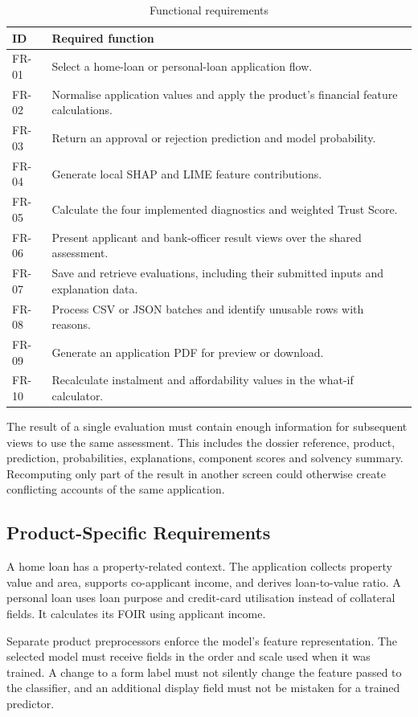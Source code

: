 \begin{table}[htbp]\centering\small
\caption{Functional requirements}\label{tab:functional-requirements}
\begin{tabularx}{\textwidth}{p{1.3cm}X}\toprule
ID & Required function\\\midrule
FR-01 & Select a home-loan or personal-loan application flow.\\
FR-02 & Normalise application values and apply the product's financial feature calculations.\\
FR-03 & Return an approval or rejection prediction and model probability.\\
FR-04 & Generate local SHAP and LIME feature contributions.\\
FR-05 & Calculate the four implemented diagnostics and weighted Trust Score.\\
FR-06 & Present applicant and bank-officer result views over the shared assessment.\\
FR-07 & Save and retrieve evaluations, including their submitted inputs and explanation data.\\
FR-08 & Process CSV or JSON batches and identify unusable rows with reasons.\\
FR-09 & Generate an application PDF for preview or download.\\
FR-10 & Recalculate instalment and affordability values in the what-if calculator.\\\bottomrule
\end{tabularx}\end{table}

The result of a single evaluation must contain enough information for subsequent views to use the same assessment. This includes the dossier reference, product, prediction, probabilities, explanations, component scores and solvency summary. Recomputing only part of the result in another screen could otherwise create conflicting accounts of the same application.

\subsection{Product-Specific Requirements}
A home loan has a property-related context. The application collects property value and area, supports co-applicant income, and derives loan-to-value ratio. A personal loan uses loan purpose and credit-card utilisation instead of collateral fields. It calculates its FOIR using applicant income.

Separate product preprocessors enforce the model's feature representation. The selected model must receive fields in the order and scale used when it was trained. A change to a form label must not silently change the feature passed to the classifier, and an additional display field must not be mistaken for a trained predictor.

